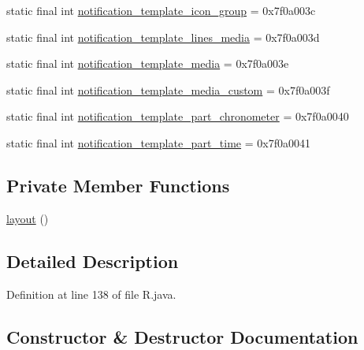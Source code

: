 \begin{DoxyCompactItemize}
\item 
static final int \mbox{\hyperlink{classandroid_1_1support_1_1v4_1_1_r_1_1layout_adb60bfc7580cc8b8c0a2c836af85cf2e}{notification\+\_\+template\+\_\+icon\+\_\+group}} = 0x7f0a003c
\item 
static final int \mbox{\hyperlink{classandroid_1_1support_1_1v4_1_1_r_1_1layout_ab9cb748d281e13c924f1ab4bca00b5d2}{notification\+\_\+template\+\_\+lines\+\_\+media}} = 0x7f0a003d
\item 
static final int \mbox{\hyperlink{classandroid_1_1support_1_1v4_1_1_r_1_1layout_a5043b85625c735625170c86528159787}{notification\+\_\+template\+\_\+media}} = 0x7f0a003e
\item 
static final int \mbox{\hyperlink{classandroid_1_1support_1_1v4_1_1_r_1_1layout_ae87875e57b9c4f61398ff57329b12161}{notification\+\_\+template\+\_\+media\+\_\+custom}} = 0x7f0a003f
\item 
static final int \mbox{\hyperlink{classandroid_1_1support_1_1v4_1_1_r_1_1layout_a15acaf706c5dcf6b2891b13c721f749d}{notification\+\_\+template\+\_\+part\+\_\+chronometer}} = 0x7f0a0040
\item 
static final int \mbox{\hyperlink{classandroid_1_1support_1_1v4_1_1_r_1_1layout_a9fb910fd134e67244f19fc9e38e6ba2c}{notification\+\_\+template\+\_\+part\+\_\+time}} = 0x7f0a0041
\end{DoxyCompactItemize}
\subsection*{Private Member Functions}
\begin{DoxyCompactItemize}
\item 
\mbox{\hyperlink{classandroid_1_1support_1_1v4_1_1_r_1_1layout_a3fd58c5dfaf0857c58e66b2f068402c2}{layout}} ()
\end{DoxyCompactItemize}


\subsection{Detailed Description}


Definition at line 138 of file R.\+java.



\subsection{Constructor \& Destructor Documentation}
\mbox{\label{classandroid_1_1support_1_1v4_1_1_r_1_1layout_a3fd58c5dfaf0857c58e66b2f068402c2}} 
